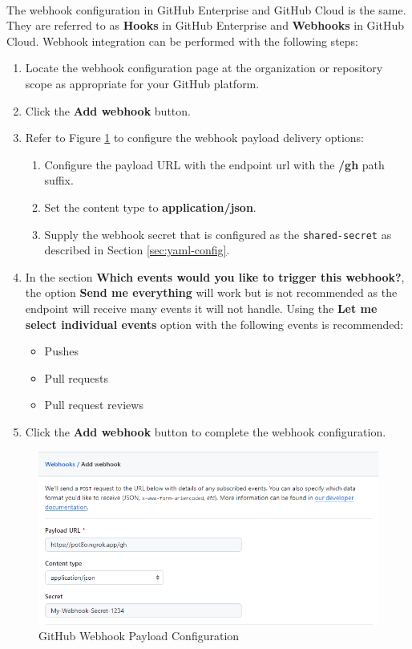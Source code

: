 \noindent\\The webhook configuration in GitHub Enterprise and GitHub Cloud is the same.  They are referred to as \textbf{Hooks} in
GitHub Enterprise and \textbf{Webhooks} in GitHub Cloud.  Webhook integration can be performed with the following steps:

\begin{enumerate}
    \item Locate the webhook configuration page at the organization or repository scope as appropriate for your
    GitHub platform.
    \item Click the \textbf{Add webhook} button.
    \item Refer to Figure \ref{fig:gh-webhook-1} to configure the webhook payload delivery options:
    \begin{enumerate}
        \item Configure the payload URL with the \cxoneflow endpoint url with the \textbf{/gh} path suffix.
        \item Set the content type to \textbf{application/json}.
        \item Supply the webhook secret that is configured as the \texttt{shared-secret} as described in
        Section \ref{sec:yaml-config}.
    \end{enumerate}
    \item In the section \textbf{Which events would you like to trigger this webhook?}, the option \textbf{Send me everything}
    will work but is not recommended as the \cxoneflow endpoint will receive many events it will not handle.  Using the
    \textbf{Let me select individual events} option with the following events is recommended:
    \begin{itemize}
        \item Pushes
        \item Pull requests
        \item Pull request reviews
    \end{itemize}
    \item Click the \textbf{Add webhook} button to complete the webhook configuration.
\end{enumerate}

\begin{figure}[ht]
    \includegraphics[width=\textwidth]{graphics/gh-webhook-1.png}
    \caption{GitHub Webhook Payload Configuration}
    \label{fig:gh-webhook-1}
\end{figure}



